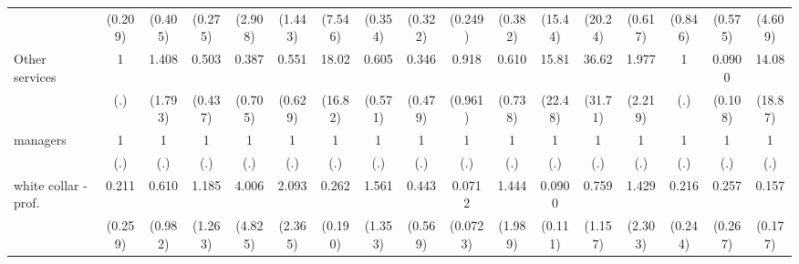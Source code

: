 {\begin{tabular}{l*{16}{c}}
                    &     (0.209)         &     (0.405)         &     (0.275)         &     (2.908)         &     (1.443)         &     (7.546)         &     (0.354)         &     (0.322)         &     (0.249)         &     (0.382)         &     (15.44)         &     (20.24)         &     (0.617)         &     (0.846)         &     (0.575)         &     (4.609)         \\
[1em]
Other services      &           1         &       1.408         &       0.503         &       0.387         &       0.551         &       18.02\sym{**} &       0.605         &       0.346         &       0.918         &       0.610         &       15.81         &       36.62\sym{***}&       1.977         &           1         &      0.0900\sym{*}  &       14.08\sym{*}  \\
                    &         (.)         &     (1.793)         &     (0.437)         &     (0.705)         &     (0.629)         &     (16.82)         &     (0.571)         &     (0.479)         &     (0.961)         &     (0.738)         &     (22.48)         &     (31.71)         &     (2.219)         &         (.)         &     (0.108)         &     (18.87)         \\
[1em]
managers            &           1         &           1         &           1         &           1         &           1         &           1         &           1         &           1         &           1         &           1         &           1         &           1         &           1         &           1         &           1         &           1         \\
                    &         (.)         &         (.)         &         (.)         &         (.)         &         (.)         &         (.)         &         (.)         &         (.)         &         (.)         &         (.)         &         (.)         &         (.)         &         (.)         &         (.)         &         (.)         &         (.)         \\
[1em]
white collar - prof.&       0.211         &       0.610         &       1.185         &       4.006         &       2.093         &       0.262         &       1.561         &       0.443         &      0.0712\sym{**} &       1.444         &      0.0900         &       0.759         &       1.429         &       0.216         &       0.257         &       0.157         \\
                    &     (0.259)         &     (0.982)         &     (1.263)         &     (4.825)         &     (2.365)         &     (0.190)         &     (1.353)         &     (0.569)         &    (0.0723)         &     (1.989)         &     (0.111)         &     (1.157)         &     (2.303)         &     (0.244)         &     (0.267)         &     (0.177)         \\

\end{tabular}}
